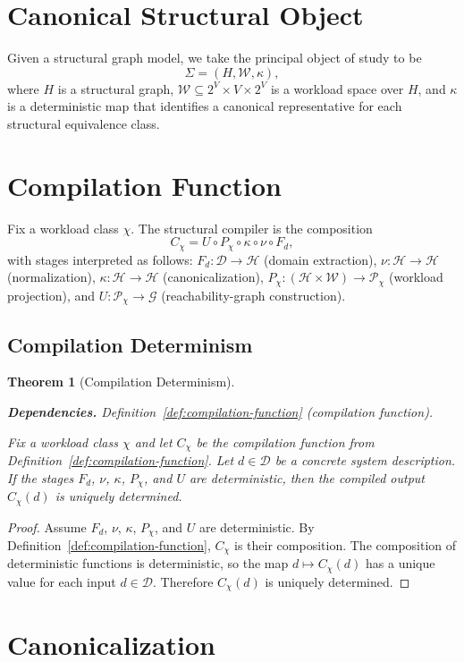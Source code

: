 \documentclass[11pt]{article}
\newtheorem{theorem}{Theorem}
\newcommand{\deps}[1]{\par\noindent\textbf{Dependencies.} #1\par}
\begin{document}
\section{Canonical Structural Object}
\label{sec:canonical-structural-object}
Given a structural graph model, we take the principal object of study to be
\[
\Sigma=(H,\mathcal{W},\kappa),
\]
where $H$ is a structural graph, $\mathcal{W}\subseteq 2^V\times V\times 2^V$ is a workload space over $H$, and $\kappa$ is a deterministic map that identifies a canonical representative for each structural equivalence class.

\section{Compilation Function}
\label{sec:compilation-function}
Fix a workload class $\chi$. The structural compiler is the composition
\[
C_\chi = U\circ P_\chi\circ\kappa\circ\nu\circ F_d,
\]
with stages interpreted as follows: $F_d:\mathcal{D}\to\mathcal{H}$ (domain extraction), $\nu:\mathcal{H}\to\mathcal{H}$ (normalization), $\kappa:\mathcal{H}\to\mathcal{H}$ (canonicalization), $P_\chi:(\mathcal{H}\times\mathcal{W})\to\mathcal{P}_\chi$ (workload projection), and $U:\mathcal{P}_\chi\to\mathcal{G}$ (reachability-graph construction).

\subsection{Compilation Determinism}
\begin{theorem}[Compilation Determinism]
\label{thm:compilation-determinism}
\deps{Definition~\ref{def:compilation-function} (compilation function).}
Fix a workload class $\chi$ and let $C_\chi$ be the compilation function from Definition~\ref{def:compilation-function}.
Let $d\in\mathcal D$ be a concrete system description.
If the stages $F_d$, $\nu$, $\kappa$, $P_\chi$, and $U$ are deterministic, then the compiled output $C_\chi(d)$ is uniquely determined.
\end{theorem}
\begin{proof}
Assume $F_d$, $\nu$, $\kappa$, $P_\chi$, and $U$ are deterministic.
By Definition~\ref{def:compilation-function}, $C_\chi$ is their composition.
The composition of deterministic functions is deterministic, so the map $d\mapsto C_\chi(d)$ has a unique value for each input $d\in\mathcal D$.
Therefore $C_\chi(d)$ is uniquely determined.
\end{proof}


\section{Canonicalization}
\label{sec:canonicalization}
\end{document}
